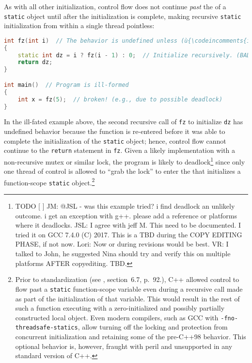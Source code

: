 As with all other initialization, control flow does not continue
\emph{past} the  of a \lstinline!static! object until
after the initialization is complete, making recursive \lstinline!static!
initialization from within a single thread pointless:

\begin{lstlisting}[language=C++]
int fz(int i)  // The behavior is undefined unless (ù{\codeincomments{i}}ù) is 0.
{
    static int dz = i ? fz(i - 1) : 0;  // Initialize recursively. (BAD IDEA)
    return dz;
}

int main()  // Program is ill-formed
{
    int x = fz(5);  // broken! (e.g., due to possible deadlock)
}
\end{lstlisting}
    
\noindent In the ill-fated example above, the second recursive call of \lstinline!fz!
to initialize \lstinline!dz! has undefined behavior because the function is
re-entered before it was able to complete the initialization of the
\lstinline!static! object; hence, control flow cannot continue to the
\lstinline!return! statement in \lstinline!fz!. Given a likely implementation
with a non-recursive mutex or similar lock, the program is likely to
deadlock{\cprotect\footnote{TODO {[} {]} JM: @JSL - was this example
tried? i find deadlock an unlikely outcome. i get an exception with
g++. please add a reference or platforms where it deadlocks. JSL: I
agree with jeff M. This need to be documented. I tried it on GCC 7.4.0
(C) 2017. This is a TBD during the COPY EDITING PHASE, if not now.
Lori: Now or during revisions would be best. VR: I talked to John, he
suggested Nina should try and verify this on multiple platforms AFTER
  copyediting. TBD.}} since only one thread of control is allowed to
``grab the lock'' to enter the  that
initializes a function-scope \lstinline!static!
object.{\cprotect\footnote{Prior to standardization (see \cite{ellis90},
section~6.7, p.~92.), C++ allowed control to flow past a
\lstinline!static! function-scope variable even during a recursive call
made as part of the initialization of that variable. This would result
in the rest of such a function executing with a zero-initialized and
possibly partially constructed local object. Even modern compilers,
such as GCC with \lstinline!-fno-threadsafe-statics!, allow turning off
the locking and protection from concurrent initialization and
retaining some of the pre-C++98 behavior. This optional behavior is,
however, fraught with peril and unsupported in any standard version of
  C++.}}

